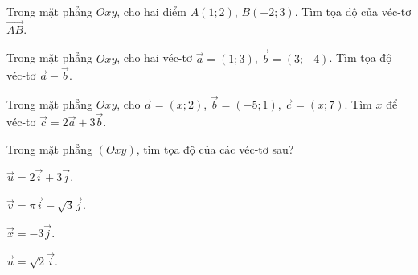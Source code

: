 \begin{bt}%
	Trong mặt phẳng $Oxy$, cho hai điểm $A(1; 2)$, $B(-2; 3)$. Tìm tọa độ của véc-tơ $\overrightarrow{AB}$.
\end{bt}

\begin{bt}%
	Trong mặt phẳng $Oxy$, cho hai véc-tơ $\overrightarrow{a}=(1;3)$, $\overrightarrow{b}=(3;-4)$. Tìm tọa độ véc-tơ $\overrightarrow{a}-\overrightarrow{b}$.
\end{bt}

\begin{bt}%
	Trong mặt phẳng $Oxy$, cho $\overrightarrow{a}=(x;2)$, $\overrightarrow{b}=(-5;1)$, $\overrightarrow{c}=(x;7)$. Tìm $x$ để véc-tơ $\overrightarrow{c}=2\overrightarrow{a}+3\overrightarrow{b}$.
\end{bt}

\begin{bt}%
    Trong mặt phẳng $(Oxy)$, tìm tọa độ của các véc-tơ sau?
    \begin{listEX}[2]
        \item $\overrightarrow{u}=2\overrightarrow{i}+3\overrightarrow{j}$.
        \item $\overrightarrow{v}=\pi\overrightarrow{i}-\sqrt{3}\overrightarrow{j}$.
        \item $\overrightarrow{x}=-3\overrightarrow{j}$.
        \item $\overrightarrow{u}=\sqrt{2}\overrightarrow{i}$.
    \end{listEX}
\end{bt}

